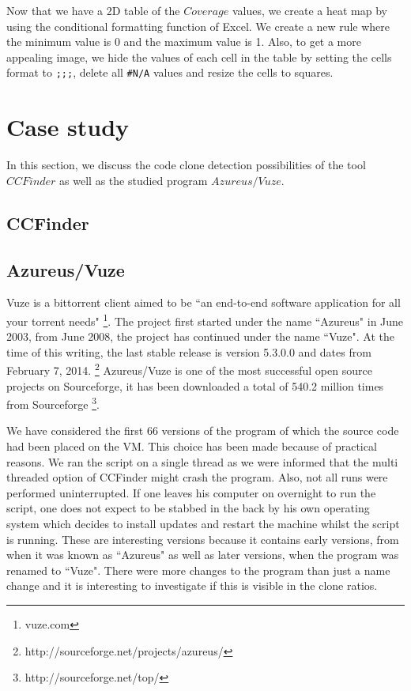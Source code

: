 \documentclass[a4paper,twoside, twocolumn, 11pt]{article}
\numberwithin{equation}{section}
\begin{document}
Now that we have a 2D table of the $Coverage$ values, we create a heat map by using the conditional formatting function of Excel.
We create a new rule where the minimum value is 0 and the maximum value is 1.
Also, to get a more appealing image, we hide the values of each cell in the table by setting the cells format to \texttt{;;;}, delete all \texttt{\#N/A} values and resize the cells to squares.


\section{Case study}
In this section, we discuss the code clone detection possibilities of the tool $CCFinder$ as well as the studied program $Azureus/Vuze$.

\subsection{CCFinder}


\subsection{Azureus/Vuze}
Vuze is a bittorrent client aimed to be ``an end-to-end software application for all your torrent needs" \footnote{vuze.com}.
The project first started under the name ``Azureus" in June 2003, from June 2008, the project has continued under the name ``Vuze".
At the time of this writing, the last stable release is version 5.3.0.0 and dates from February 7, 2014. \footnote{http://sourceforge.net/projects/azureus/}
Azureus/Vuze is one of the most successful open source projects on Sourceforge, it has been downloaded a total of 540.2 million times from Sourceforge \footnote{http://sourceforge.net/top/}.

We have considered the first 66 versions of the program of which the source code had been placed on the VM. 
This choice has been made because of practical reasons. We ran the script on a single thread as we were informed that the multi threaded option of CCFinder might crash the program.
Also, not all runs were performed uninterrupted. 
If one leaves his computer on overnight to run the script, one does not expect to be stabbed in the back by his own operating system which decides to install updates and restart the machine whilst the script is running. 
These are interesting versions because it contains early versions, from when it was known as ``Azureus" as well as later versions, when the program was renamed to ``Vuze".
There were more changes to the program than just a name change %
and it is interesting to investigate if this is visible in the clone ratios. %
\end{document}
